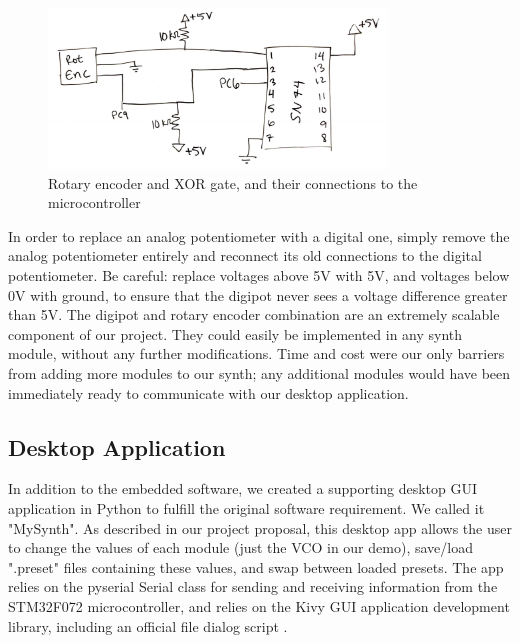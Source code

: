 \documentclass[letterpaper, 12 pt, conference]{ieeeconf}
\begin{document}
\begin{figure}[ht]
\includegraphics[width=9cm]{rotenc}
\centering
\caption{Rotary encoder and XOR gate, and their connections to the microcontroller}
\label{rotencfig}
\end{figure}

In order to replace an analog potentiometer with a digital one, simply remove the analog potentiometer entirely and reconnect its old connections to the digital potentiometer. Be careful: replace voltages above 5V with 5V, and voltages below 0V with ground, to ensure that the digipot never sees a voltage difference greater than 5V. The digipot and rotary encoder combination are an extremely scalable component of our project. They could easily be implemented in any synth module, without any further modifications. Time and cost were our only barriers from adding more modules to our synth; any additional modules would have been immediately ready to communicate with our desktop application.
    


\subsection{Desktop Application}

In addition to the embedded software, we created a supporting desktop GUI application in Python to fulfill the original software requirement. We called it "MySynth". As described in our project proposal, this desktop app allows the user to change the values of each module (just the VCO in our demo), save/load ".preset" files containing these values, and swap between loaded presets. The app relies on the pyserial Serial class for sending and receiving information from the STM32F072 microcontroller, and relies on the Kivy GUI application development library, including an official file dialog script \cite{pyserial} \cite{filechooser}.
\end{document}
